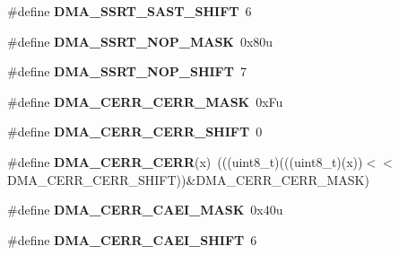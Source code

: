 \begin{DoxyCompactItemize}
\item 
\#define {\bfseries D\+M\+A\+\_\+\+S\+S\+R\+T\+\_\+\+S\+A\+S\+T\+\_\+\+S\+H\+I\+FT}~6\hypertarget{group__DMA__Register__Masks_gac7f4ffa288a04ba1361b240caf7188d7}{}\label{group__DMA__Register__Masks_gac7f4ffa288a04ba1361b240caf7188d7}

\item 
\#define {\bfseries D\+M\+A\+\_\+\+S\+S\+R\+T\+\_\+\+N\+O\+P\+\_\+\+M\+A\+SK}~0x80u\hypertarget{group__DMA__Register__Masks_gad515a6cb794fc947138fac918dedd068}{}\label{group__DMA__Register__Masks_gad515a6cb794fc947138fac918dedd068}

\item 
\#define {\bfseries D\+M\+A\+\_\+\+S\+S\+R\+T\+\_\+\+N\+O\+P\+\_\+\+S\+H\+I\+FT}~7\hypertarget{group__DMA__Register__Masks_ga0c698d2dc363fc0487cccc5dfbd4fed5}{}\label{group__DMA__Register__Masks_ga0c698d2dc363fc0487cccc5dfbd4fed5}

\item 
\#define {\bfseries D\+M\+A\+\_\+\+C\+E\+R\+R\+\_\+\+C\+E\+R\+R\+\_\+\+M\+A\+SK}~0x\+Fu\hypertarget{group__DMA__Register__Masks_ga291fce290f4fce77f31d4f210781a5cc}{}\label{group__DMA__Register__Masks_ga291fce290f4fce77f31d4f210781a5cc}

\item 
\#define {\bfseries D\+M\+A\+\_\+\+C\+E\+R\+R\+\_\+\+C\+E\+R\+R\+\_\+\+S\+H\+I\+FT}~0\hypertarget{group__DMA__Register__Masks_ga3aed793831e2681ef8989bbe67ffaa17}{}\label{group__DMA__Register__Masks_ga3aed793831e2681ef8989bbe67ffaa17}

\item 
\#define {\bfseries D\+M\+A\+\_\+\+C\+E\+R\+R\+\_\+\+C\+E\+RR}(x)~(((uint8\+\_\+t)(((uint8\+\_\+t)(x))$<$$<$D\+M\+A\+\_\+\+C\+E\+R\+R\+\_\+\+C\+E\+R\+R\+\_\+\+S\+H\+I\+FT))\&D\+M\+A\+\_\+\+C\+E\+R\+R\+\_\+\+C\+E\+R\+R\+\_\+\+M\+A\+SK)\hypertarget{group__DMA__Register__Masks_ga8b912d2bceaf84a23183c7e93a862b1f}{}\label{group__DMA__Register__Masks_ga8b912d2bceaf84a23183c7e93a862b1f}

\item 
\#define {\bfseries D\+M\+A\+\_\+\+C\+E\+R\+R\+\_\+\+C\+A\+E\+I\+\_\+\+M\+A\+SK}~0x40u\hypertarget{group__DMA__Register__Masks_ga7998031f3e0e7906d352da54eb92a1a8}{}\label{group__DMA__Register__Masks_ga7998031f3e0e7906d352da54eb92a1a8}

\item 
\#define {\bfseries D\+M\+A\+\_\+\+C\+E\+R\+R\+\_\+\+C\+A\+E\+I\+\_\+\+S\+H\+I\+FT}~6\hypertarget{group__DMA__Register__Masks_ga04db9fa5c262642ad17f27d1cad24fba}{}\label{group__DMA__Register__Masks_ga04db9fa5c262642ad17f27d1cad24fba}


\end{DoxyCompactItemize}

